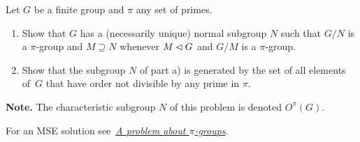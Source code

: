 \begin{probl}\label{problem-1.B.8}
    Let $G$ be a finite group and $\pi$ any set of primes.
    \begin{enumerate}[\upshape a)]
    \item Show that\/ $G$ has a (necessarily unique) normal subgroup\/ $N$ such that\/ $G/N$ is a $\pi$-group and $M\supseteq N$ whenever $M\lhd G$ and $G/M$ is a $\pi$-group.
    \item Show that the subgroup\/ $N$ of part\/ {\upshape a)} is generated by the set of all elements of\/~$G$ that have order not divisible by any prime in $\pi$.
    \end{enumerate}

    \textrm{\upshape\textbf{Note.} The characteristic subgroup $N$ of this problem is denoted $O^\pi(G)$.}
    
    \textrm{ For an MSE solution see~\href{https://math.stackexchange.com/q/688412/269050}{\it A problem about $\pi$-groups}.}
\end{probl}

